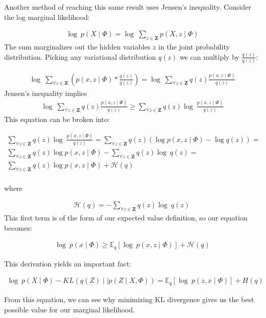 Another method of reaching this same result uses Jensen's inequality. Consider the log marginal likelihood:

\begin{align}\log\ p(X\mid \Phi) = \log\ \sum\limits_{z \in \mathbf{Z}} p(X,z\mid \Phi)\end{align}
The sum marginalizes out the hidden variables $z$ in the joint probability distribution. Picking any variational distribution $q(z)$ we can multiply by $\frac{q(z)}{q(z)}$:


\begin{align} \log\ \sum\limits_{\forall z \in \mathbf{Z}} ( p(x,z\mid \Phi) * \frac{q(z)}{q(z)} ) = \log\ \sum\limits_{\forall z \in \mathbf{Z}} q(z) \frac{ p(x,z\mid \Phi) }{q(z)}\end{align}
Jensen's inequality implies
\begin{align}\log\ \sum\limits_{\forall z \in \mathbf{Z}} q(z) \frac{p(x,z\mid \Phi) }{q(z)}  \geq \sum\limits_{\forall z \in \mathbf{Z}} q(z) \log\ \frac{ p(x,z\mid \Phi) }{q(z)} \end{align}
This equation can be broken into: 

\begin{align}
\nonumber \sum\limits_{\forall z \in \mathbf{Z}} q(z) \log\ \frac{ p(x,z\mid \Phi) }{q(z)}= \sum\limits_{\forall z \in \mathbf{Z}} q(z) (\log p(x,z\mid \Phi) - \log q(z)) = \\
 \nonumber \sum\limits_{\forall z \in \mathbf{Z}} q(z) \log p(x,z\mid \Phi) - \sum\limits_{\forall z \in \mathbf{Z}}  q(z)\log\ q(z) =  \\
 \sum\limits_{\forall z \in \mathbf{Z}} q(z) \log p(x,z\mid \Phi) + \mathcal{H}(q)\\
\end{align}

where 

\begin{align}
\mathcal{H}(q) =  - \sum\limits_{\forall z \in \mathbf{Z}}  q(z)\log\ q(z) \
\end{align} \citep{blei:2017} This first term is of the form of our expected value definition, so our equation becomes:


\begin{align} \log\ p(x\mid \Phi) \geq \mathbb{E}_q[\log\ p(x,z\mid \Phi)] + \mathcal{H}(q) \end{align}


This derivation yields an important fact: 

\begin{align}
\log\ p(X\mid \Phi) - KL(q(Z) \mid \mid  p(Z\mid X, \Phi)) = \mathbb{E}_q[\log\ p(z,x \mid  \Phi)] + H(q) \end{align}

From this equation, we can see why minimizing KL divergence gives us the best possible value for our marginal likelihood.



